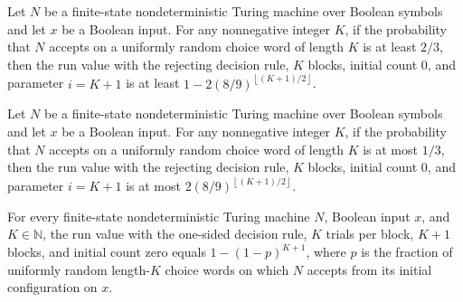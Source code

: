 \begin{theorem}
\label{Randomized.PolyAmp.runVal_two_ge}
\leanok
{}
Let $N$ be a finite-state nondeterministic Turing machine over Boolean symbols and let
$x$ be a Boolean input. For any nonnegative integer $K$, if the probability that $N$
accepts on a uniformly random choice word of length $K$ is at least $2/3$, then the run
value with the rejecting decision rule, $K$ blocks, initial count $0$, and parameter
$i=K+1$ is at least $1-2(8/9)^{\left\lfloor (K+1)/2 \right\rfloor}$.
\end{theorem}

\begin{theorem}
\label{Randomized.PolyAmp.runVal_two_le}
\leanok
{}
Let $N$ be a finite-state nondeterministic Turing machine over Boolean symbols and let
$x$ be a Boolean input. For any nonnegative integer $K$, if the probability that $N$
accepts on a uniformly random choice word of length $K$ is at most $1/3$, then the run
value with the rejecting decision rule, $K$ blocks, initial count $0$, and parameter
$i=K+1$ is at most $2(8/9)^{\left\lfloor (K+1)/2 \right\rfloor}$.
\end{theorem}

\begin{theorem}
\label{Randomized.PolyAmp.runVal_one}
\leanok
{}
For every finite-state nondeterministic Turing machine $N$, Boolean input $x$, and
$K\in\mathbb N$, the run value with the one-sided decision rule, $K$ trials per block,
$K+1$ blocks, and initial count zero equals $1-(1-p)^{K+1}$, where $p$ is the fraction
of uniformly random length-$K$ choice words on which $N$ accepts from its initial
configuration on $x$.
\end{theorem}

